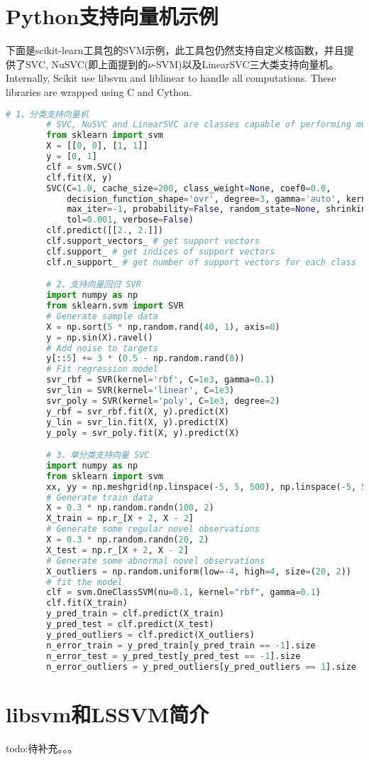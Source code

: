 \section{Python支持向量机示例}
    \par
    下面是scikit-learn工具包的SVM示例，此工具包仍然支持自定义核函数，并且提供了SVC, NuSVC(即上面提到的$\nu$-SVM)以及LinearSVC三大类支持向量机。Internally, Scikit use libsvm and liblinear to handle all computations. These libraries are wrapped using C and Cython.
    \begin{lstlisting}[language = Python]
        # 1、分类支持向量机
        # SVC, NuSVC and LinearSVC are classes capable of performing multi-class classification on a dataset.
        from sklearn import svm
        X = [[0, 0], [1, 1]]
        y = [0, 1]
        clf = svm.SVC()
        clf.fit(X, y)
        SVC(C=1.0, cache_size=200, class_weight=None, coef0=0.0,
            decision_function_shape='ovr', degree=3, gamma='auto', kernel='rbf',
            max_iter=-1, probability=False, random_state=None, shrinking=True,
            tol=0.001, verbose=False)
        clf.predict([[2., 2.]])
        clf.support_vectors_ # get support vectors
        clf.support_ # get indices of support vectors
        clf.n_support_ # get number of support vectors for each class

        # 2、支持向量回归 SVR
        import numpy as np
        from sklearn.svm import SVR
        # Generate sample data
        X = np.sort(5 * np.random.rand(40, 1), axis=0)
        y = np.sin(X).ravel()
        # Add noise to targets
        y[::5] += 3 * (0.5 - np.random.rand(8))
        # Fit regression model
        svr_rbf = SVR(kernel='rbf', C=1e3, gamma=0.1)
        svr_lin = SVR(kernel='linear', C=1e3)
        svr_poly = SVR(kernel='poly', C=1e3, degree=2)
        y_rbf = svr_rbf.fit(X, y).predict(X)
        y_lin = svr_lin.fit(X, y).predict(X)
        y_poly = svr_poly.fit(X, y).predict(X)

        # 3、单分类支持向量 SVC
        import numpy as np
        from sklearn import svm
        xx, yy = np.meshgrid(np.linspace(-5, 5, 500), np.linspace(-5, 5, 500))
        # Generate train data
        X = 0.3 * np.random.randn(100, 2)
        X_train = np.r_[X + 2, X - 2]
        # Generate some regular novel observations
        X = 0.3 * np.random.randn(20, 2)
        X_test = np.r_[X + 2, X - 2]
        # Generate some abnormal novel observations
        X_outliers = np.random.uniform(low=-4, high=4, size=(20, 2))
        # fit the model
        clf = svm.OneClassSVM(nu=0.1, kernel="rbf", gamma=0.1)
        clf.fit(X_train)
        y_pred_train = clf.predict(X_train)
        y_pred_test = clf.predict(X_test)
        y_pred_outliers = clf.predict(X_outliers)
        n_error_train = y_pred_train[y_pred_train == -1].size
        n_error_test = y_pred_test[y_pred_test == -1].size
        n_error_outliers = y_pred_outliers[y_pred_outliers == 1].size
    \end{lstlisting}

\section{libsvm和LSSVM简介}
    \par
    todo:待补充。。。

